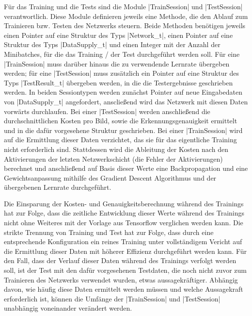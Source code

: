 \documentclass[../main.tex]{subfiles}
\begin{document}
Für das Training und die Tests sind die Module |TrainSession| und |TestSession| verantwortlich. Diese Module definieren jeweils eine Methode, die den Ablauf zum Trainieren bzw. Testen des Netzwerks steuern. Beide Methoden benötigen jeweils einen Pointer auf eine Struktur des Typs |Network_t|, einen Pointer auf eine Struktur des Typs |DataSupply_t| und einen Integer mit der Anzahl der Minibatches, für die das Training / der Test durchgeführt werden soll. Für eine |TrainSession| muss darüber hinaus die zu verwendende Lernrate übergeben werden; für eine |TestSession| muss zusätzlich ein Pointer auf eine Struktur des Typs |TestResult_t| übergeben werden, in die die Testergebnisse geschrieben werden. In beiden Sessiontypen werden zunächst Pointer auf neue Eingabedaten von |DataSupply_t| angefordert, anscließend wird das Netzwerk mit diesen Daten vorwärts durchlaufen. Bei einer |TestSession| werden anschließend die durchschnittlichen Kosten pro Bild, sowie die Erkennungsgenauigkeit ermittelt und in die dafür vorgesehene Struktur geschrieben. Bei einer |TrainSession| wird auf die Ermittlung dieser Daten verzichtet, das sie für das eigentliche Training nicht erforderlich sind. Stattdessen wird die Ableitung der Kosten nach den Aktivierungen der letzten Netzwerkschicht (die Fehler der Aktivierungen) berechnet und anschließend auf Basis dieser Werte eine Backpropagation und eine Gewichtsanpassung mithilfe des Gradient Descent Algorithmus und der übergebenen Lernrate durchgeführt. 

Die Einsparung der Kosten- und Genauigkeitsberechnung während des Trainings hat zur Folge, dass die zeitliche Entwicklung dieser Werte während des Trainings nicht ohne Weiteres mit der Vorlage aus Tensorflow verglichen werden kann. Die strikte Trennung von Training und Test hat zur Folge, dass durch eine entsprechende Konfiguration ein reines Training unter vollständigem Vericht auf die Ermittlung dieser Daten mit höherer Effizienz durchgeführt werden kann. Für den Fall, dass der Verlauf dieser Daten während des Trainings verfolgt werden soll, ist der Test mit den dafür vorgesehenen Testdaten, die noch nicht zuvor zum Trainieren des Netzwerks verwendet wurden, etwas aussagekräftiger. Abhängig davon, wie häufig diese Daten ermittelt werden müssen und welche Aussagekraft erforderlich ist, können die Umfänge der |TrainSession| und |TestSession| unabhängig voneinander verändert werden. 
\end{document}
